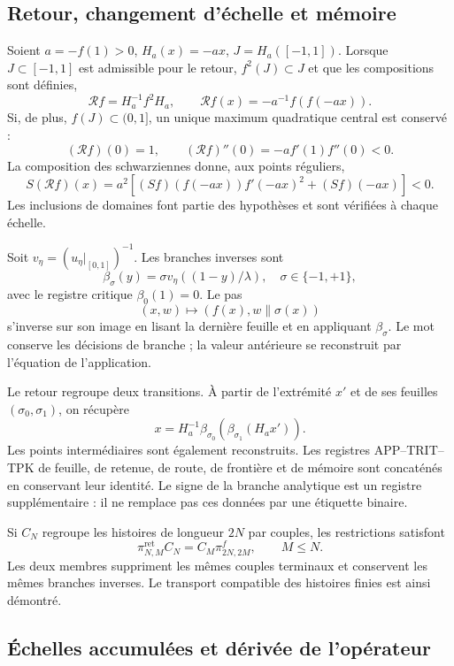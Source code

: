 \subsection{Retour, changement d’échelle et mémoire}
\label{hmtfg:desarrollo:5}

Soient \(a=-f(1)>0\), \(H_a(x)=-ax\), \(J=H_a([-1,1])\). Lorsque \(J\subset[-1,1]\) est admissible pour le retour, \(f^2(J)\subset J\) et que les compositions sont définies,
\[
\mathcal Rf=H_a^{-1}f^2H_a,\qquad
\mathcal Rf(x)=-a^{-1}f(f(-ax)).
\]
Si, de plus, \(f(J)\subset(0,1]\), un unique maximum quadratique central est conservé :
\[
(\mathcal Rf)(0)=1,\qquad
(\mathcal Rf)''(0)=-a f'(1)f''(0)<0.
\]
La composition des schwarziennes donne, aux points réguliers,
\[
S(\mathcal Rf)(x)=a^2
\left[(Sf)(f(-ax))f'(-ax)^2+(Sf)(-ax)\right]<0.
\]
Les inclusions de domaines font partie des hypothèses et sont vérifiées à chaque échelle.

Soit \(v_\eta=(u_\eta|_{[0,1]})^{-1}\). Les branches inverses sont
\[
\beta_\sigma(y)=\sigma v_\eta((1-y)/\lambda),\quad
\sigma\in\{-1,+1\},
\]
avec le registre critique \(\beta_0(1)=0\). Le pas
\[
(x,w)\longmapsto(f(x),w\mathbin{\|}\sigma(x))
\]
s’inverse sur son image en lisant la dernière feuille et en appliquant \(\beta_\sigma\). Le mot conserve les décisions de branche ; la valeur antérieure se reconstruit par l’équation de l’application.

Le retour regroupe deux transitions. À partir de l’extrémité \(x'\) et de ses feuilles \((\sigma_0,\sigma_1)\), on récupère
\[
x=H_a^{-1}\beta_{\sigma_0}
\!\left(\beta_{\sigma_1}(H_ax')\right).
\]
Les points intermédiaires sont également reconstruits. Les registres APP–TRIT–TPK de feuille, de retenue, de route, de frontière et de mémoire sont concaténés en conservant leur identité. Le signe de la branche analytique est un registre supplémentaire : il ne remplace pas ces données par une étiquette binaire.

Si \(C_N\) regroupe les histoires de longueur \(2N\) par couples, les restrictions satisfont
\[
\pi^{\mathrm{ret}}_{N,M}C_N
=C_M\pi^f_{2N,2M},\qquad M\le N.
\]
Les deux membres suppriment les mêmes couples terminaux et conservent les mêmes branches inverses. Le transport compatible des histoires finies est ainsi démontré.


\subsection{Échelles accumulées et dérivée de l’opérateur}
\label{hmtfg:desarrollo:6}

